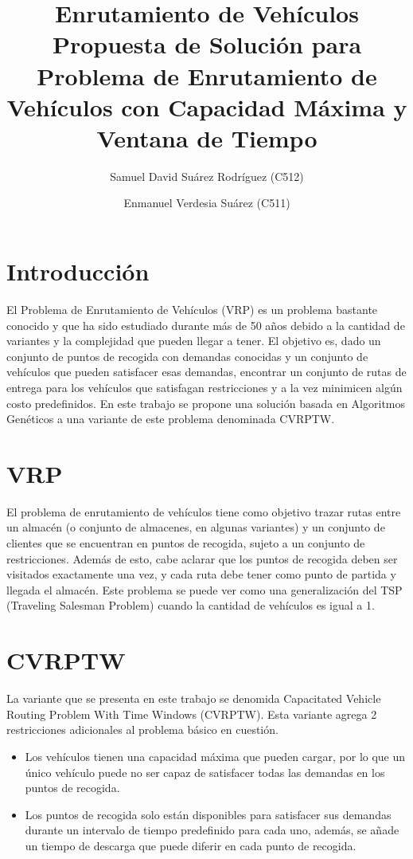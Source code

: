\documentclass[12pt]{llncs}
\title{Enrutamiento de Vehículos \\ Propuesta de Solución para Problema de Enrutamiento de Vehículos con Capacidad Máxima y Ventana de Tiempo}
\author{
    Samuel David Suárez Rodríguez (C512) \and
    Enmanuel Verdesia Suárez (C511)
}
\date{}
\institute{Universidad de La Habana}
\begin{document}
\maketitle

\section*{Introducción}

El Problema de Enrutamiento de Vehículos (VRP) es un problema bastante conocido y que ha sido estudiado durante más de 50 años debido a la cantidad de variantes y la complejidad que pueden llegar a tener. El objetivo es, dado un conjunto de puntos de recogida con demandas conocidas y un conjunto de vehículos que pueden satisfacer esas demandas, encontrar un conjunto de rutas de entrega para los vehículos que satisfagan restricciones y a la vez minimicen algún costo predefinidos. En este trabajo se propone una solución basada en Algoritmos Genéticos a una variante de este problema denominada CVRPTW.

\section*{VRP}

El problema de enrutamiento de vehículos tiene como objetivo trazar rutas entre un almacén (o conjunto de almacenes, en algunas variantes) y un conjunto de clientes que se encuentran en puntos de recogida, sujeto a un conjunto de restricciones. Además de esto, cabe aclarar que los puntos de recogida deben ser visitados exactamente una vez, y cada ruta debe tener como punto de partida y llegada el almacén. Este problema se puede ver como una generalización del TSP (Traveling Salesman Problem) cuando la cantidad de vehículos es igual a 1.

\section*{CVRPTW}

La variante que se presenta en este trabajo se denomida Capacitated Vehicle Routing Problem With Time Windows (CVRPTW). Esta variante agrega 2 restricciones adicionales al problema básico en cuestión.

\begin{itemize}
    \item Los vehículos tienen una capacidad máxima que pueden cargar, por lo que un único vehículo puede no ser capaz de satisfacer todas las demandas en los puntos de recogida.
    \item Los puntos de recogida solo están disponibles para satisfacer sus demandas durante un intervalo de tiempo predefinido para cada uno, además, se añade un tiempo de descarga que puede diferir en cada punto de recogida.
\end{itemize}
\end{document}
